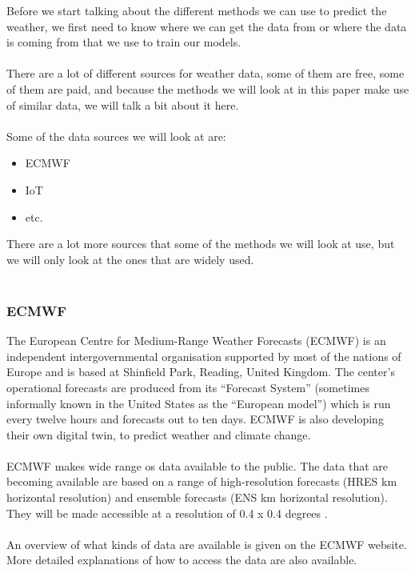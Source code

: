 \documentclass[../paper.tex]{subfiles}
\begin{document}
    Before we start talking about the different methods we can use to predict the weather, we first need to know where we can get the data from or where the data is coming from that we use to train our models.
    \\\\
    There are a lot of different sources for weather data, some of them are free, some of them are paid, and because the methods we will look at in this paper make use of similar data, we will talk a bit about it here.
    \\\\
    Some of the data sources we will look at are:
    \begin{itemize}
        \item ECMWF
        \item IoT
        \item etc.
    \end{itemize}
    There are a lot more sources that some of the methods we will look at use, but we will only look at the ones that are widely used.
    \\\\
    \subsubsection{ECMWF}
    The European Centre for Medium-Range Weather Forecasts (ECMWF) is an independent intergovernmental organisation supported by most of the nations of Europe and is based at Shinfield Park, Reading, United Kingdom.
    The center's operational forecasts are produced from its ``Forecast System'' (sometimes informally known in the United States as the ``European model'') which is run every twelve hours and forecasts out to ten days\cite{b4}.
    ECMWF is also developing their own digital twin, to predict weather and climate change\cite{b5}.
    \\\\
    ECMWF makes wide range os data available to the public.
    The data that are becoming available are based on a range of high-resolution forecasts (HRES  km horizontal resolution) and ensemble forecasts (ENS  km horizontal resolution).
    They will be made accessible at a resolution of 0.4 x 0.4 degrees \cite{ecmwf_data_free}.
    \\\\
    An overview of what kinds of data are available is given on the ECMWF website.
    More detailed explanations of how to access the data are also available\cite{ecmwf_data_free}.
\end{document}
